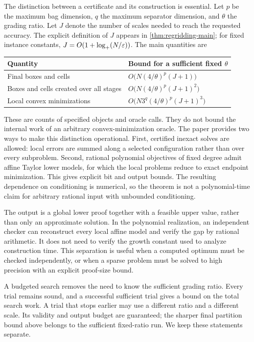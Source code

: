 The distinction between a certificate and its construction is essential.
Let $p$ be the maximum bag dimension, $q$ the maximum separator dimension,
and $\theta$ the grading ratio. Let $J$ denote the number of scales needed
to reach the requested accuracy. The explicit definition of $J$ appears
in \cref{thm:regridding-main}; for fixed instance constants,
$J=O(1+\log_+(N/\varepsilon))$. The main quantities are
\begin{center}
\begin{tabular}{@{}ll@{}}
\toprule
Quantity & Bound for a sufficient fixed $\theta$\\
\midrule
Final boxes and cells & $O\bigl(N(4/\theta)^p(J+1)\bigr)$\\
Boxes and cells created over all stages & $O\bigl(N(4/\theta)^p(J+1)^2\bigr)$\\
Local convex minimizations & $O\bigl(N3^q(4/\theta)^p(J+1)^3\bigr)$\\
\bottomrule
\end{tabular}
\end{center}
These are counts of specified objects and oracle calls. They do not bound
the internal work of an arbitrary convex-minimization oracle. The paper
provides two ways to make this distinction operational. First, certified
inexact solves are allowed: local errors are summed along a selected
configuration rather than over every subproblem. Second, rational
polynomial objectives of fixed degree admit affine Taylor lower models,
for which the local problems reduce to exact endpoint minimization.
This gives explicit bit and output bounds. The resulting dependence on
conditioning is numerical, so the theorem is not a polynomial-time claim
for arbitrary rational input with unbounded conditioning.

The output is a global lower proof together with a feasible upper value,
rather than only an approximate solution. In the polynomial realization,
an independent checker can reconstruct every local affine model and verify
the gap by rational arithmetic. It does not need to verify the growth
constant used to analyze construction time. This separation is useful
when a computed optimum must be checked independently, or when a sparse
problem must be solved to high precision with an explicit proof-size bound.

A budgeted search removes the need to know the sufficient grading ratio.
Every trial remains sound, and a successful sufficient trial gives a
bound on the total search work. A trial that stops earlier may use a
different ratio and a different scale. Its validity and output budget are
guaranteed; the sharper final partition bound above belongs to the
sufficient fixed-ratio run. We keep these statements separate.

